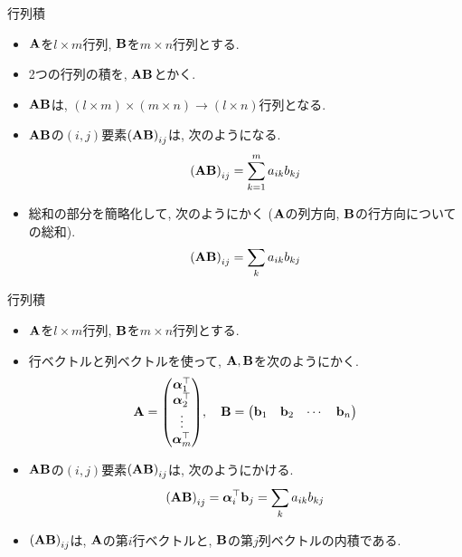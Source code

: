 \documentclass[dvipdfmx,notheorems,t]{beamer}
\begin{document}
\begin{frame}{行列積}
\begin{itemize}
  \item $\vb{A}$を$l \times m$行列, $\vb{B}$を$m \times n$行列とする.
  \item 2つの行列の積を, $\vb{A} \vb{B}$とかく.
  \item $\vb{A} \vb{B}$は, $(l \times m) \times (m \times n) \to (l \times n)$行列となる.
  \item $\vb{A} \vb{B}$の$(i, j)$要素$\left( \vb{A} \vb{B} \right)_{ij}$は, 次のようになる.
  \begin{align*}
    \left( \vb{A} \vb{B} \right)_{ij} = \sum_{k = 1}^m a_{ik} b_{kj}
  \end{align*}
  \item 総和の部分を簡略化して, 次のようにかく ($\vb{A}$の列方向, $\vb{B}$の行方向についての総和).
  \begin{align*}
    \left( \vb{A} \vb{B} \right)_{ij} = \sum_k a_{ik} b_{kj}
  \end{align*}
\end{itemize}
\end{frame}

\begin{frame}{行列積}
\begin{itemize}
  \item $\vb{A}$を$l \times m$行列, $\vb{B}$を$m \times n$行列とする.
  \item 行ベクトルと列ベクトルを使って, $\vb{A}, \vb{B}$を次のようにかく.
  \begin{align*}
    \vb{A} = \mqty(\vb*{\alpha}_1^\top \\ \vb*{\alpha}_2^\top \\ \vdots \\ \vb*{\alpha}_m^\top),
      \quad \vb{B} = \mqty(\vb{b}_1 & \vb{b}_2 & \cdots & \vb{b}_n)
  \end{align*}
  \item $\vb{A} \vb{B}$の$(i, j)$要素$\left( \vb{A} \vb{B} \right)_{ij}$は, 次のようにかける.
  \begin{align*}
    \left( \vb{A} \vb{B} \right)_{ij} = \vb*{\alpha}_i^\top \vb{b}_j
      = \sum_k a_{ik} b_{kj}
  \end{align*}
  \item $\left( \vb{A} \vb{B} \right)_{ij}$は, $\vb{A}$の第$i$行ベクトルと, $\vb{B}$の第$j$列ベクトルの内積である.
\end{itemize}
\end{frame}
\end{document}
